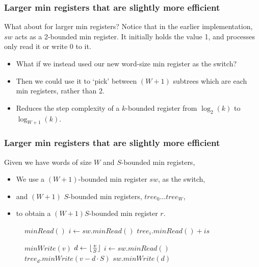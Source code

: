 \documentclass{beamer}
\makeatletter
\DeclarePairedDelimiter\floor{\lfloor}{\rfloor}
\newcommand{\alglinenoNew}[1]{\newcounter{ALG@line@#1}}
\newcommand{\alglinenoPop}[1]{\setcounter{ALG@line}{\value{ALG@line@#1}}}
\newcommand{\alglinenoPush}[1]{\setcounter{ALG@line@#1}{\value{ALG@line}}}
\makeatother
\begin{document}
\begin{frame}
	\frametitle{Larger min registers that are slightly more efficient}
	What about for larger min registers? Notice that in the earlier implementation, $sw$ acts as a 2-bounded min register.
	It initially holds the value 1, and processes only read it or write 0 to it.
	\begin{itemize}
		\item What if we instead used our new word-size min register as the switch?
		\item Then we could use it to `pick' between $(W+1)$ subtrees which are each min registers, rather than 2.
		\item Reduces the step complexity of a $k$-bounded register from $\log_2(k)$ to $\log_{W+1}(k)$.
	\end{itemize}
\end{frame}
\begin{frame}
	\frametitle{Larger min registers that are slightly more efficient}
	Given we have words of size $W$ and $S$-bounded min registers,
	\begin{itemize}
		\item We use a $(W+1)$-bounded min register $sw$, as the switch,
		\item and $(W+1)$ $S$-bounded min registers, $tree_0 \dots tree_W$,
		\item to obtain a $(W+1)S$-bounded min register $r$.
	\end{itemize}
\end{frame}

\begin{frame}
	\begin{figure}[H]
		\begin{algorithmic}[1]
			\State $minRead()$
			\Indent
				\State $i \gets sw.minRead()$ 
				\State \Return $tree_i.minRead() + is$
			\EndIndent 
		\alglinenoNew{alg3}
		\alglinenoPush{alg3}
		\end{algorithmic}
		\begin{algorithmic}[1]
			\alglinenoPop{alg3}
				\State $minWrite(v)$
				\Indent
					\State $d \gets \floor{\frac{v}{S}}$
					\State $i \gets sw.minRead()$ 
						\State $tree_d.minWrite(v - d \cdot S)$
							$sw.minWrite(d)$
						\EndIf
					\EndIf
				\EndIndent   
			\alglinenoPush{alg3}
			\end{algorithmic}
	\end{figure}
\end{frame}


\begin{frame}
	\begin{figure}[H]
		\centering
	\end{figure}
\end{frame}
\end{document}
